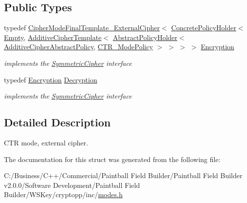 \subsection*{Public Types}
\begin{DoxyCompactItemize}
\item 
\hypertarget{struct_c_t_r___mode___external_cipher_a8ab6bcd15b8bb44d49076708feda772c}{
typedef \hyperlink{class_cipher_mode_final_template___external_cipher}{CipherModeFinalTemplate\_\-ExternalCipher}$<$ \hyperlink{class_concrete_policy_holder}{ConcretePolicyHolder}$<$ \hyperlink{class_empty}{Empty}, \hyperlink{class_additive_cipher_template}{AdditiveCipherTemplate}$<$ \hyperlink{class_abstract_policy_holder}{AbstractPolicyHolder}$<$ \hyperlink{struct_additive_cipher_abstract_policy}{AdditiveCipherAbstractPolicy}, \hyperlink{class_c_t_r___mode_policy}{CTR\_\-ModePolicy} $>$ $>$ $>$ $>$ \hyperlink{struct_c_t_r___mode___external_cipher_a8ab6bcd15b8bb44d49076708feda772c}{Encryption}}
\label{struct_c_t_r___mode___external_cipher_a8ab6bcd15b8bb44d49076708feda772c}

\begin{DoxyCompactList}\small\item\em implements the \hyperlink{class_symmetric_cipher}{SymmetricCipher} interface \item\end{DoxyCompactList}\item 
\hypertarget{struct_c_t_r___mode___external_cipher_a931e7e4cf74d14a3ca6ce7a88ece5ae6}{
typedef \hyperlink{class_cipher_mode_final_template___external_cipher}{Encryption} \hyperlink{struct_c_t_r___mode___external_cipher_a931e7e4cf74d14a3ca6ce7a88ece5ae6}{Decryption}}
\label{struct_c_t_r___mode___external_cipher_a931e7e4cf74d14a3ca6ce7a88ece5ae6}

\begin{DoxyCompactList}\small\item\em implements the \hyperlink{class_symmetric_cipher}{SymmetricCipher} interface \item\end{DoxyCompactList}\end{DoxyCompactItemize}


\subsection{Detailed Description}
CTR mode, external cipher. 

The documentation for this struct was generated from the following file:\begin{DoxyCompactItemize}
\item 
C:/Business/C++/Commercial/Paintball Field Builder/Paintball Field Builder v2.0.0/Software Development/Paintball Field Builder/WSKey/cryptopp/inc/\hyperlink{modes_8h}{modes.h}\end{DoxyCompactItemize}
